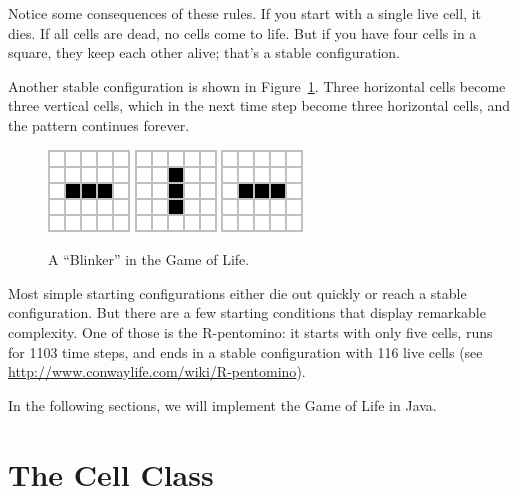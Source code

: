 
Notice some consequences of these rules.
If you start with a single live cell, it dies.
If all cells are dead, no cells come to life.
But if you have four cells in a square, they keep each other alive; that's a stable configuration.

Another stable configuration is shown in Figure~\ref{fig:blinker}.
Three horizontal cells become three vertical cells, which in the next time step become three horizontal cells, and the pattern continues forever.

\begin{figure}[!ht]
\begin{center}
\includegraphics{figs/blinker-0.png}
\raisebox{38pt}{~$\longrightarrow$~}
\includegraphics{figs/blinker-1.png}
\raisebox{38pt}{~$\longrightarrow$~}
\includegraphics{figs/blinker-0.png}
\raisebox{38pt}{~$\longrightarrow$~ \ldots}
\caption{A ``Blinker'' in the Game of Life.}
\label{fig:blinker}
\end{center}
\end{figure}

Most simple starting configurations either die out quickly or reach a stable configuration.
But there are a few starting conditions that display remarkable complexity.
One of those is the R-pentomino: it starts with only five cells, runs for 1103 time steps, and ends in a stable configuration with 116 live cells (see
\url{http://www.conwaylife.com/wiki/R-pentomino}).

In the following sections, we will implement the Game of Life in Java.


\section{The Cell Class}

